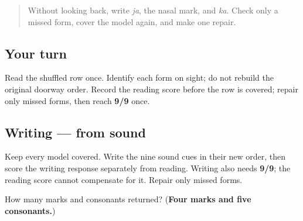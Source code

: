 \begin{quote}
Without looking back, write \emph{ja}, the nasal mark, and \emph{ka}. Check only a missed form, cover the model again, and make one repair.
\end{quote}

\subsection*{Your turn}
Read the shuffled row once. Identify each form on sight; do not rebuild the original doorway order. Record the reading score before the row is covered; repair only missed forms, then reach \textbf{9/9} once.

\subsection*{Writing — from sound}
Keep every model covered. Write the nine sound cues in their new order, then score the writing response separately from reading. Writing also needs \textbf{9/9}; the reading score cannot compensate for it. Repair only missed forms.

\begin{tcolorbox}[breakable,colback=teal!4,colframe=teal!35!black,title={Before you move on}]
How many marks and consonants returned? (\textbf{Four marks and five consonants.})
\end{tcolorbox}
